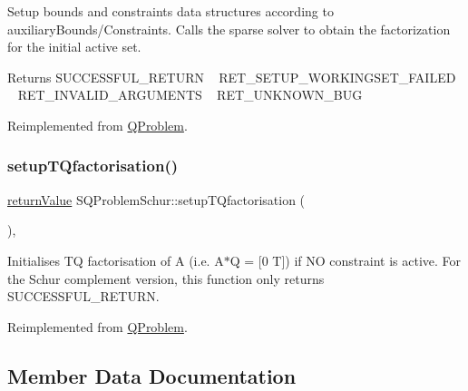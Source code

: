 Setup bounds and constraints data structures according to auxiliary\+Bounds/\+Constraints. Calls the sparse solver to obtain the factorization for the initial active set. \begin{DoxyReturn}{Returns}
S\+U\+C\+C\+E\+S\+S\+F\+U\+L\+\_\+\+R\+E\+T\+U\+RN ~\newline
 R\+E\+T\+\_\+\+S\+E\+T\+U\+P\+\_\+\+W\+O\+R\+K\+I\+N\+G\+S\+E\+T\+\_\+\+F\+A\+I\+L\+ED ~\newline
 R\+E\+T\+\_\+\+I\+N\+V\+A\+L\+I\+D\+\_\+\+A\+R\+G\+U\+M\+E\+N\+TS ~\newline
 R\+E\+T\+\_\+\+U\+N\+K\+N\+O\+W\+N\+\_\+\+B\+UG 
\end{DoxyReturn}


Reimplemented from \hyperlink{class_q_problem_a1779e923a5f84cdddd33bbe38735f58c}{Q\+Problem}.

\mbox{\label{class_s_q_problem_schur_a51aa150223f6fd36b22db84090b97cbf}} 
\subsubsection{\texorpdfstring{setup\+T\+Qfactorisation()}{setupTQfactorisation()}}
{\footnotesize\ttfamily \hyperlink{_message_handling_8hpp_a81d556f613bfbabd0b1f9488c0fa865e}{return\+Value} S\+Q\+Problem\+Schur\+::setup\+T\+Qfactorisation (\begin{DoxyParamCaption}{ }\end{DoxyParamCaption})\hspace{0.3cm}{\ttfamily [protected]}, {\ttfamily [virtual]}}

Initialises TQ factorisation of A (i.\+e. A$\ast$Q = \mbox{[}0 T\mbox{]}) if NO constraint is active. For the Schur complement version, this function only returns S\+U\+C\+C\+E\+S\+S\+F\+U\+L\+\_\+\+R\+E\+T\+U\+RN. 

Reimplemented from \hyperlink{class_q_problem_a08d6dfbf81516910e5d7af60f4f67faa}{Q\+Problem}.



\subsection{Member Data Documentation}
\mbox{\label{class_s_q_problem_schur_a93a583e326b93672fb8cd4ff1b8d3465}} 
